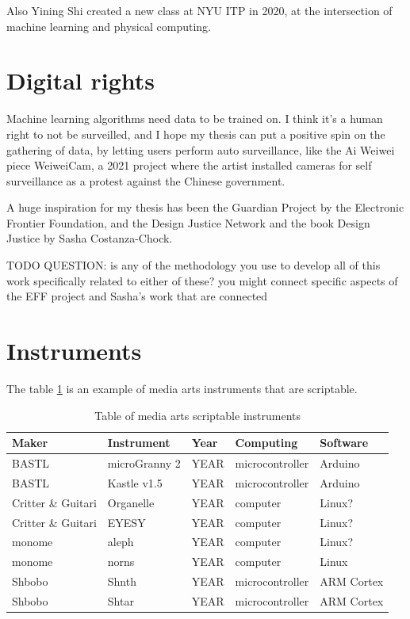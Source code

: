 Also Yining Shi created a new class at NYU ITP in 2020, at the intersection of machine learning and physical computing.

\section{Digital rights}

Machine learning algorithms need data to be trained on. I think it’s a human right to not be surveilled, and I hope my thesis can put a positive spin on the gathering of data, by letting users perform auto surveillance, like the Ai Weiwei piece WeiweiCam, a 2021 project where the artist installed cameras for self surveillance as a protest against the Chinese government.

A huge inspiration for my thesis has been the Guardian Project by the Electronic Frontier Foundation, and the Design Justice Network and the book Design Justice by Sasha Costanza-Chock.

TODO QUESTION: is any of the methodology you use to develop all of this work specifically related to either of these? you might connect specific aspects of the EFF project and Sasha's work that are connected


\section{Instruments}

The table \ref{table:media-arts-scriptable-instruments} is an example of media arts instruments that are scriptable.

\begin{table}[h!]
    \centering
    \begin{tabular}{ | l | l | l | l | l | }
        Maker & Instrument & Year & Computing & Software \\ 
        \hline 
        BASTL & microGranny 2 & YEAR & microcontroller & Arduino \\
        BASTL & Kastle v1.5 & YEAR &microcontroller  & Arduino \\
        Critter \& Guitari & Organelle & YEAR & computer & Linux? \\
        Critter \& Guitari & EYESY & YEAR & computer & Linux? \\
        monome & aleph & YEAR & computer & Linux? \\
        monome & norns & YEAR & computer & Linux \\
        Shbobo & Shnth & YEAR & microcontroller & ARM Cortex \\
        Shbobo & Shtar & YEAR & microcontroller & ARM Cortex 
    \end{tabular}
    \caption{Table of media arts scriptable instruments}
    \label{table:media-arts-scriptable-instruments}
\end{table}


